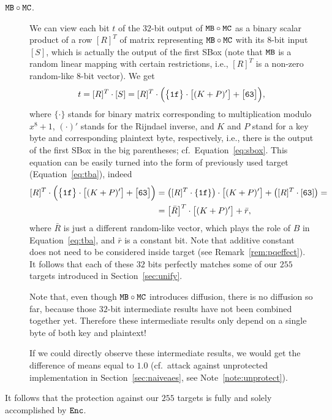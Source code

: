 \begin{description}
	\item[$\texttt{MB}\circ\texttt{MC}$.] We can view each bit $t$ of the $32$-bit output of $\texttt{MB}\circ\texttt{MC}$ as a binary scalar product of a row $[R]^T$ of matrix representing $\texttt{MB}\circ\texttt{MC}$ with its $8$-bit input $[S]$, which is actually the output of the first SBox (note that $\texttt{MB}$ is a random linear mapping with certain restrictions, i.e., $[R]^T$ is a non-zero random-like $8$-bit vector). We get
	\begin{equation*}
		t = [R]^T\cdot [S] = [R]^T\cdot\Bigl( \bigl\{\texttt{1f}\bigr\}\cdot\bigl[(K+P)'\bigr] + \bigl[\texttt{63}\bigr] \Bigr) ,
	\end{equation*}
	where $\{\cdot\}$ stands for binary matrix corresponding to multiplication modulo $x^8+1$, $(\cdot)'$ stands for the Rijndael inverse, and $K$ and $P$ stand for a key byte and corresponding plaintext byte, respectively, i.e., there is the output of the first SBox in the big parentheses; cf.\ Equation~\ref{eq:sbox}. This equation can be easily turned into the form of previously used target (Equation~\ref{eq:tba}), indeed
	\begin{align}
	\label{eq:mbmctarget}
		[R]^T\cdot\Bigl( \bigl\{\texttt{1f}\bigr\}\cdot\bigl[(K+P)'\bigr] + \bigl[\texttt{63}\bigr] \Bigr) &= \bigl([R]^T\cdot \{\texttt{1f}\}\bigr)\cdot\bigl[(K+P)'\bigr] + \bigl([R]^T\cdot [\texttt{63}]\bigr) = \nonumber \\
		&= \bigl[\bar R\bigr]^T \cdot \bigl[(K+P)'\bigr] + \bar r ,
	\end{align}
	where $\bar R$ is just a different random-like vector, which plays the role of $B$ in Equation~\ref{eq:tba}, and $\bar r$ is a constant bit. Note that additive constant does not need to be considered inside target (see Remark~\ref{rem:pqeffect}). It follows that each of these $32$ bits perfectly matches some of our $255$ targets introduced in Section~\ref{sec:unify}.
	
	Note that, even though $\texttt{MB}\circ\texttt{MC}$ introduces diffusion, there is no diffusion so far, because those $32$-bit intermediate results have not been combined together yet. Therefore these intermediate results only depend on a single byte of both key and plaintext!
	
	If we could directly observe these intermediate results, we would get the difference of means equal to $1.0$ (cf.\ attack against unprotected implementation in Section~\ref{sec:naiveaes}, see Note~\ref{note:unprotect}).
\end{description}
\begin{remark}
\label{rem:enc}
	It follows that the protection against our $255$ targets is fully and solely accomplished by $\texttt{Enc}$.
\end{remark}
